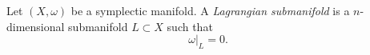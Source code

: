 

    Let $(X,  \omega)$ be a symplectic manifold.
    A \emph{Lagrangian submanifold} is a $n$-dimensional submanifold $L\subset X$ such that 
    \[\omega|_L=0.\]


